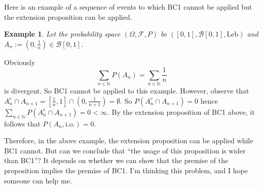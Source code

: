 \documentclass[a4paper, linespread=1.5]{article}
\newtheorem{example}[theorem]{Example}
\newcommand{\Natural}{\mathbb{N}}
\newcommand{\BorelSet}{\mathcal{B}}
\begin{document}
    \medskip
    
    Here is an example of a sequence of events to which BC1 cannot be applied but the extension proposition can be applied.
    \begin{example}
        Let the probability space $(\Omega, \mathcal{F}, P)$ be $([0, 1], \BorelSet[0, 1], \textrm{Leb})$ and $A_n := (0, \frac{1}{n}) \in \BorelSet[0, 1]$.
    \end{example}
    Obviously
    $$
    \sum_{n \in \Natural} P(A_n) = \sum_{n \in \Natural} \frac{1}{n}
    $$
    is divergent. So BC1 cannot be applied to this example. However, observe that $A_n^c \cap A_{n + 1} = [\frac{1}{n}, 1] \cap (0, \frac{1}{n + 1}) = \emptyset$. So $P(A_n^c \cap A_{n + 1}) = 0$ hence $\sum\limits_{n \in \Natural} P(A_n^c \cap A_{n + 1}) = 0 < \infty$. By the extension proposition of BC1 above, it follows that $P(A_n, \textrm{i.o.}) = 0$.
    
    Therefore, in the above example, the extension proposition can be applied while BC1 cannot. But can we conclude that ``the usage of this proposition is wider than BC1''? It depends on whether we can show that the premise of the proposition implies the premise of BC1. I'm thinking this problem, and I hope someone can help me.

    
    
\end{document}
